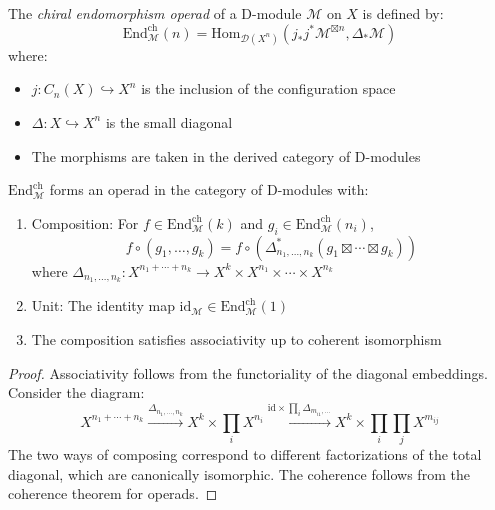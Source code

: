 \begin{definition}\label{def:chiral-endo}
The \emph{chiral endomorphism operad} of a D-module $\mathcal{M}$ on $X$ is defined by:
\[
\text{End}_{\mathcal{M}}^{\text{ch}}(n) = \text{Hom}_{\mathcal{D}(X^n)}\left(j_*j^*\mathcal{M}^{\boxtimes n}, \Delta_*\mathcal{M}\right)
\]
where:
\begin{itemize}
\item $j: C_n(X) \hookrightarrow X^n$ is the inclusion of the configuration space
\item $\Delta: X \hookrightarrow X^n$ is the small diagonal
\item The morphisms are taken in the derived category of D-modules
\end{itemize}
\end{definition}

\begin{proposition}
\label{prop:operadic-structure}
$\text{End}_{\mathcal{M}}^{\text{ch}}$ forms an operad in the category of D-modules with:
\begin{enumerate}
\item Composition: For $f \in \text{End}_{\mathcal{M}}^{\text{ch}}(k)$ and $g_i \in \text{End}_{\mathcal{M}}^{\text{ch}}(n_i)$,
\[
f \circ (g_1, \ldots, g_k) = f \circ \left(\Delta_{n_1,\ldots,n_k}^* (g_1 \boxtimes \cdots \boxtimes g_k)\right)
\]
where $\Delta_{n_1,\ldots,n_k}: X^{n_1 + \cdots + n_k} \to X^k \times X^{n_1} \times \cdots \times X^{n_k}$

\item Unit: The identity map $\text{id}_{\mathcal{M}} \in \text{End}_{\mathcal{M}}^{\text{ch}}(1)$

\item The composition satisfies associativity up to coherent isomorphism
\end{enumerate}
\end{proposition}

\begin{proof}
Associativity follows from the functoriality of the diagonal embeddings. Consider the diagram:
\[
X^{n_1 + \cdots + n_k} \xrightarrow{\Delta_{n_1,\ldots,n_k}} X^k \times \prod_i X^{n_i}
\xrightarrow{\text{id} \times \prod_i \Delta_{m_{i1},\ldots}} X^k \times \prod_i \prod_j X^{m_{ij}}
\]
The two ways of composing correspond to different factorizations of the total diagonal, which are
canonically isomorphic. The coherence follows from the coherence theorem for operads.
\end{proof}

